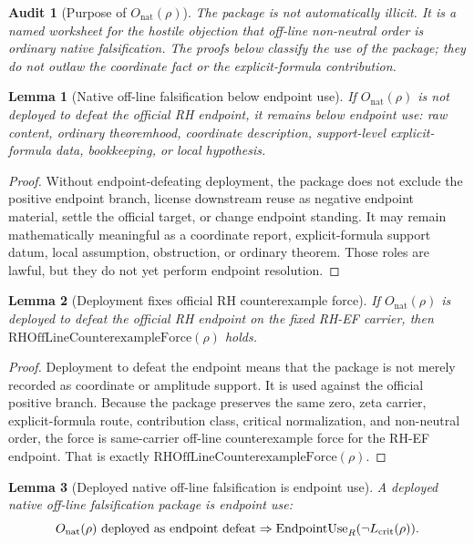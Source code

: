 \documentclass[11pt]{article}
\newtheorem{lemma}{Lemma}[section]
\newtheorem{audit}{Audit}[section]
\newcommand{\Lcrit}{L_{\mathrm{crit}}}
\newcommand{\EndpointUse}{\mathrm{EndpointUse}}
\newcommand{\RHOffCxForce}{\mathrm{RHOffLineCounterexampleForce}}
\newcommand{\Onat}{O_{\mathrm{nat}}}
\begin{document}
\begin{audit}[Purpose of \(\Onat(\rho)\)]
The package is not automatically illicit.  It is a named worksheet for the hostile objection that off-line non-neutral order is ordinary native falsification.  The proofs below classify the use of the package; they do not outlaw the coordinate fact or the explicit-formula contribution.
\end{audit}

\begin{lemma}[Native off-line falsification below endpoint use]
If \(\Onat(\rho)\) is not deployed to defeat the official RH endpoint, it remains below endpoint use: raw content, ordinary theoremhood, coordinate description, support-level explicit-formula data, bookkeeping, or local hypothesis.
\end{lemma}

\begin{proof}
Without endpoint-defeating deployment, the package does not exclude the positive endpoint branch, license downstream reuse as negative endpoint material, settle the official target, or change endpoint standing.  It may remain mathematically meaningful as a coordinate report, explicit-formula support datum, local assumption, obstruction, or ordinary theorem.  Those roles are lawful, but they do not yet perform endpoint resolution.
\end{proof}

\begin{lemma}[Deployment fixes official RH counterexample force]
If \(\Onat(\rho)\) is deployed to defeat the official RH endpoint on the fixed RH-EF carrier, then \(\RHOffCxForce(\rho)\) holds.
\end{lemma}

\begin{proof}
Deployment to defeat the endpoint means that the package is not merely recorded as coordinate or amplitude support.  It is used against the official positive branch.  Because the package preserves the same zero, zeta carrier, explicit-formula route, contribution class, critical normalization, and non-neutral order, the force is same-carrier off-line counterexample force for the RH-EF endpoint.  That is exactly \(\RHOffCxForce(\rho)\).
\end{proof}

\begin{lemma}[Deployed native off-line falsification is endpoint use]
A deployed native off-line falsification package is endpoint use:
\[
\Onat(\rho)\hbox{ deployed as endpoint defeat}\Rightarrow \EndpointUse_R(\neg\Lcrit(\rho)).
\]
\end{lemma}
\end{document}
